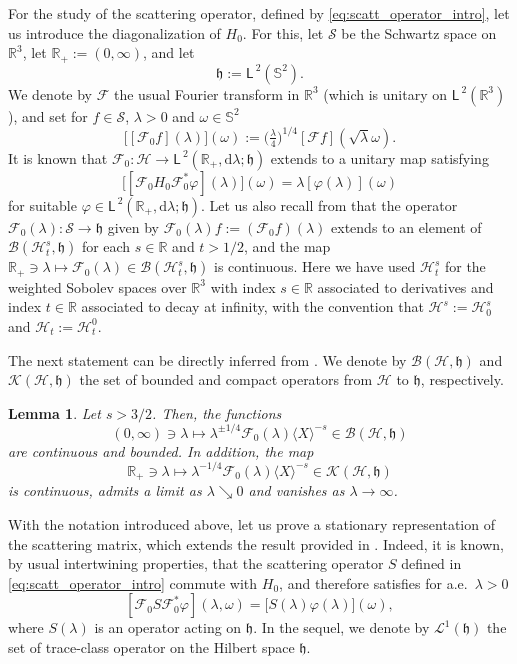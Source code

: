 \documentclass{article}
\def\B{\mathscr B}
\def\d{\mathrm{d}}
\def\F{\mathscr F}
\def\H{\mathcal H}
\def\K{\mathscr K}
\def\L{\mathcal L}
\def\R{\mathbb R}
\def\S{\mathbb S}
\def\SS{\mathscr S}
\def\HS{\mathfrak h}
\def\ltwo{\mathsf{L}^{\:\!\!2}}
\newtheorem{Lemma}[Theorem]{Lemma}
\begin{document}
For the study of the scattering operator, defined by \eqref{eq:scatt_operator_intro}, let us introduce the diagonalization of $H_0$.
For this, let $\SS$ be the Schwartz space on $\R^3$, let $\R_+:=(0,\infty)$, 
and let
$$
\HS:=\ltwo(\S^2).
$$
We denote by $\F$ the usual Fourier transform
in $\R^3$ (which is unitary on $\ltwo(\R^3)$), and set for $f\in \SS$, $\lambda>0$ and $\omega\in \S^2$
$$
\big[[\F_0 f](\lambda)\big](\omega):= \big(\tfrac{\lambda}{4}\big)^{1/4}[\F f](\sqrt{\lambda}\omega).
$$
It is known that $\F_0:\H\to \ltwo(\R_+, \d \lambda; \HS)$ extends to a unitary map
satisfying 
$$
\big[[\F_0 H_0 \F_0^*\varphi](\lambda)\big]( \omega) = \lambda [\varphi(\lambda)](\omega)
$$
for suitable $\varphi \in \ltwo(\R_+, \d \lambda; \HS)$.
Let us also recall from \cite[Sec.~3]{Jen81} that the operator
$\F_0(\lambda):\SS\to\HS$ given by $\F_0(\lambda)f:=(\F_0f)(\lambda)$ extends to an
element of $\B(\H^s_t,\HS)$ for each $s\in\R$ and $t>1/2$, and the map
$\R_+\ni\lambda\mapsto\F_0(\lambda)\in\B(\H^s_t,\HS)$ is continuous.
Here we have used $\H^s_t$ for the weighted Sobolev spaces
over $\R^3$ with index $s\in\R$ associated to derivatives and index $t\in\R$
associated to decay at infinity, with the convention that
$\H^s:=\H^s_0$ and $\H_t:=\H^0_t$.

The next statement can be directly inferred from \cite[Lem.~2.1 \& Lem.~2.2]{RT13}. 
We denote by $\B(\H,\HS)$ and $\K(\H,\HS)$ the set of bounded and compact operators from $\H$ to $\HS$, respectively.

\begin{Lemma}\label{lem_Fpm}
Let  $s>3/2$.  Then, the functions
$$
(0,\infty)\ni\lambda\mapsto\lambda^{\pm1/4}\F_0(\lambda) \langle X\rangle^{-s} \in\B(\H,\HS)
$$
are continuous and bounded. In addition,  the map 
$$
\R_+\ni \lambda \mapsto \lambda^{-1/4} \F_0(\lambda) \langle X\rangle^{-s} \in \K(\H,\HS)
$$
is continuous, admits a limit as $\lambda\searrow0$ and vanishes as $\lambda\to\infty$.
\end{Lemma}

With the notation introduced above, let us prove a stationary representation of the
scattering matrix, which extends the result provided in \cite[Eq.~(2.18)]{FN}.
Indeed, it is known, by usual intertwining properties, that the scattering operator $S$ defined in \eqref{eq:scatt_operator_intro} commute with $H_0$, and therefore
 satisfies for a.e.~$\lambda>0$
$$
[\F_0 S \F_0^*\varphi](\lambda,\omega) =\big[S(\lambda)\varphi(\lambda)\big](\omega),
$$
where $S(\lambda)$ is an operator acting on $\HS$.
In the sequel, we denote by $\L^1(\HS)$ the set of trace-class operator on the Hilbert space $\HS$.
\end{document}
